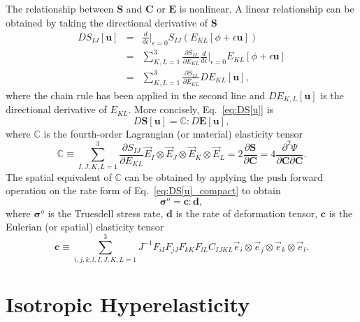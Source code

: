 The relationship between $\pmb{S}$ and $\pmb{C}$ or $\pmb{E}$ is nonlinear. A linear relationship can be obtained by taking the directional derivative of $\pmb{S}$
%
\begin{eqnarray}
DS_{IJ}[\pmb{u}] &=& \frac{d}{d\epsilon}\bigg|_{\epsilon=0}S_{IJ}(E_{KL}[\phi+\epsilon \pmb{u}]) \nonumber\\
%
&=& \sum_{K,L=1}^3 \frac{\partial S_{IJ}}{\partial E_{KL}}\frac{d}{d\epsilon}\bigg|_{\epsilon=0}E_{KL}[\phi+\epsilon \pmb{u}] \nonumber\\
%
&=&  \sum_{K,L=1}^3 \frac{\partial S_{IJ}}{\partial E_{KL}} DE_{KL}[\pmb{u}],
\label{eq:DS[u]}
\end{eqnarray}
%
where the chain rule has been applied in the second line and $DE_{K,L}[\pmb{u}]$ is the directional derivative of $E_{KL}$. More concisely, Eq.\ \eqref{eq:DS[u]} is
%
\begin{equation}
D\pmb{S}[\pmb{u}] = \pmb{\mathbb{C}}:D\pmb{E}[\pmb{u}],
\label{eq:DS[u]_compact}
\end{equation}
%
where $\pmb{\mathbb{C}}$ is the fourth-order Lagrangian (or material) elasticity tensor
%
\begin{equation}
\pmb{\mathbb{C}} \equiv \sum_{I,J,K,L=1}^3 \frac{\partial S_{IJ}}{\partial E_{KL}} \vec{E}_I \otimes \vec{E}_J \otimes \vec{E}_K \otimes \vec{E}_L = 2\frac{\partial \pmb{S}}{\partial \pmb{C}} = 4\frac{\partial^2 \Psi}{\partial \pmb{C} \partial \pmb{C}}.
\end{equation}
%
The spatial equivalent of $\pmb{\mathbb{C}}$ can be obtained by applying the push forward operation on the rate form of Eq.\ \eqref{eq:DS[u]_compact} to obtain \cite{JavierBonet:2008uxa}
%
\begin{equation}
\pmb{\sigma}^o = \pmb{c}:\pmb{d},
\end{equation}
%
where $\pmb{\sigma}^o$ is the Truesdell stress rate, $\pmb{d}$ is the rate of deformation tensor, $\pmb{c}$ is the Eulerian (or spatial) elasticity tensor
%
\begin{equation}
\pmb{c} \equiv \sum_{i,j,k,l,I,J,K,L=1}^3 J^{-1} F_{iI} F_{jJ} F_{kK} F_{lL} C_{IJKL} \vec{e}_i \otimes \vec{e}_j \otimes \vec{e}_k \otimes \vec{e}_l.
\end{equation}
%
\section{Isotropic Hyperelasticity}

